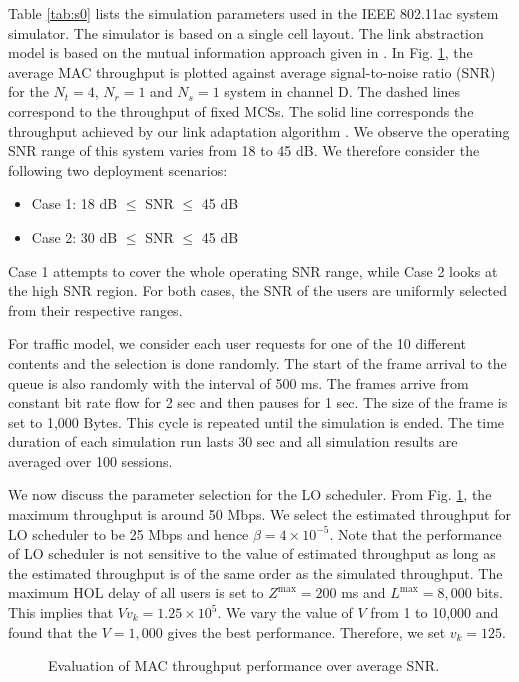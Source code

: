 \documentclass[conference]{IEEEtran}
\newcommand{\0}{\vect{0}}
\newcommand{\1}{\vect{1}}
\begin{document}
Table \ref{tab:s0} lists the simulation parameters used in the IEEE 802.11ac system simulator. The simulator is based on a single cell layout. The link abstraction model is based on the mutual information approach given in \cite{Tan08JSAC}. In Fig. \ref{fig:p1}, the average MAC throughput is plotted against average signal-to-noise ratio (SNR) for the $N_t = 4$, $N_r = 1$ and $N_s = 1$ system in channel D. The dashed lines correspond to the throughput of fixed MCSs. The solid line corresponds the throughput achieved by our link adaptation algorithm \cite{Tan08JSAC}. We observe the operating SNR range of this system varies from 18 to 45 dB. We therefore consider the following two deployment scenarios:
\begin{itemize}
\item Case 1: 18 dB $\le$ SNR $\le$ 45 dB
\item Case 2: 30 dB $\le$ SNR $\le$ 45 dB
\end{itemize}
Case 1 attempts to cover the whole operating SNR range, while Case 2 looks at the high SNR region. For both cases, the SNR of the users are uniformly selected from their respective ranges.


For traffic model, we consider each user requests for one of the 10 different contents and the selection is done randomly. The start of the frame arrival to the queue is also randomly with the interval of 500 ms. The frames arrive from constant bit rate flow for 2 sec and then pauses for 1 sec. The size of the frame is set to 1,000 Bytes. This cycle is repeated until the simulation is ended. The time duration of each simulation run lasts 30 sec and all simulation results are averaged over 100 sessions.


We now discuss the parameter selection for the LO scheduler. From Fig. \ref{fig:p1}, the maximum throughput is around 50 Mbps. We select the estimated  throughput for  LO scheduler to be 25 Mbps and hence $\beta = 4\times 10^{-5}$. Note that the performance of LO scheduler is not sensitive to the value of estimated  throughput as long as the estimated  throughput is of the same order as the simulated throughput. The maximum HOL delay of all users is set to $Z^{\max} = 200$ ms and $L^{\max} = 8,000$ bits. This implies that $Vv_k = 1.25\times 10^{5}$. We vary the value of $V$ from 1 to 10,000 and found that the $V = 1,000$ gives the best performance. Therefore, we set $v_k = 125$.

\begin{figure}[!t]
\begin{center}
\textwidth \leavevmode
{}
\caption{Evaluation of MAC throughput performance over average SNR.}
\label{fig:p1}
\end{center}
\end{figure}
\end{document}
